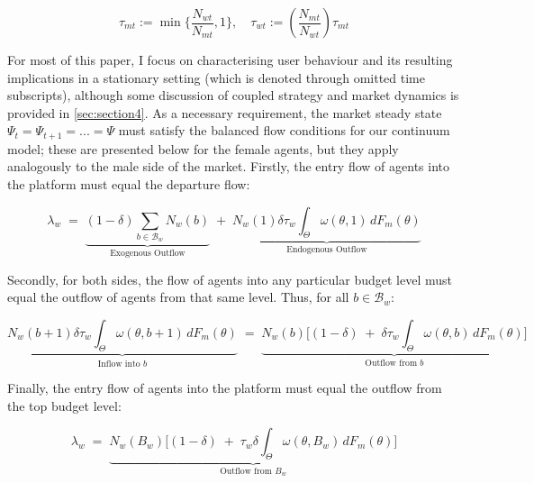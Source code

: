 
\begin{equation*}
    \tau_{mt}:=\min \Big\{\frac{N_{wt}}{N_{mt}} ,1 \Big\}, \quad \tau_{wt}:= \left(\frac{N_{mt}}{N_{wt}}\right) \tau_{mt} 
\end{equation*}


For most of this paper, I focus on characterising user behaviour and its resulting implications in a stationary setting (which is denoted through omitted time subscripts), although some discussion of coupled strategy and market dynamics is provided in \autoref{sec:section4}. As a necessary requirement, the market steady state $\Psi_t=\Psi_{t+1}=...=\Psi$ must satisfy the balanced flow conditions for our continuum model; these are presented below for the female agents, but they apply analogously to the male side of the market. Firstly, the entry flow of agents into the platform must equal the departure flow: 

\begin{equation}\label{eq:ss1} 
    \lambda_w\;=\; \underbrace{ (1-\delta)\sum_{b\in\mathcal{B}_w}N_w(b)}_{\text{Exogenous Outflow}} \;+\; \underbrace{N_w(1) \delta \tau_w\int_{\Theta}\omega(\theta,1)\,dF_{m}(\theta)}_{\text{Endogenous Outflow}} 
\end{equation} 

Secondly, for both sides, the flow of agents into any particular budget level must equal the outflow of agents from that same level. Thus, for all $b\in\mathcal{B}_w$: 

\begin{equation}\label{eq:ss2} 
    \underbrace{N_w(b+1) \delta \tau_w \int_{\Theta} \omega(\theta,b+1)\,dF_{m}(\theta)}_{\text{Inflow into $b$}} \;=\; \underbrace{N_w(b) \Big[ (1-\delta) \;+\; \delta \tau_w\int_{\Theta} \omega(\theta,b)\,dF_{m}(\theta)\Big]}_{\text{Outflow from $b$}}
\end{equation}

Finally, the entry flow of agents into the platform must equal the outflow from the top budget level:

\begin{equation}\label{eq:ss3} 
    \lambda_w \;=\; \underbrace{N_w(B_w) \Big[ (1-\delta) \;+\; \tau_w \delta \int_{\Theta} \omega(\theta,B_w)\,dF_{m}(\theta) \Big]}_{\text{Outflow from $B_w$}}
\end{equation}

